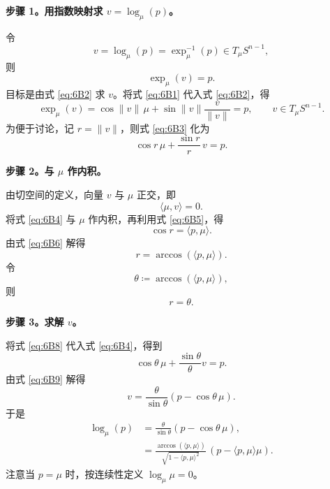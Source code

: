 \noindent\textbf{步骤 1。用指数映射求 $v=\log_\mu(p)$。}\par
令
\[
  v=\log_\mu(p)=\exp_\mu^{-1}(p)\in T_\mu S^{n-1},
\]
则
\begin{equation*}
  \exp_\mu(v)=p.
  \tag{6B2}\label{eq:6B2}
\end{equation*}
目标是由式 \eqref{eq:6B2} 求 $v$。将式 \eqref{eq:6B1} 代入式 \eqref{eq:6B2}，得
\begin{equation*}
  \exp_\mu(v)=\cos\lVert v\rVert\,\mu+\sin\lVert v\rVert\frac{v}{\lVert v\rVert}=p,
    \qquad v\in T_\mu S^{n-1}.
  \tag{6B3}\label{eq:6B3}
\end{equation*}
为便于讨论，记 $r=\lVert v\rVert$，则式 \eqref{eq:6B3} 化为
\begin{equation*}
  \cos r\,\mu+\frac{\sin r}{r}\,v=p.
  \tag{6B4}\label{eq:6B4}
\end{equation*}

\noindent\textbf{步骤 2。与 $\mu$ 作内积。}\par
由切空间的定义，向量 $v$ 与 $\mu$ 正交，即
\begin{equation*}
  \langle\mu,v\rangle=0.
  \tag{6B5}\label{eq:6B5}
\end{equation*}
将式 \eqref{eq:6B4} 与 $\mu$ 作内积，再利用式 \eqref{eq:6B5}，得
\begin{equation*}
  \cos r=\langle p,\mu\rangle.
  \tag{6B6}\label{eq:6B6}
\end{equation*}
由式 \eqref{eq:6B6} 解得
\begin{equation*}
  r=\arccos(\langle p,\mu\rangle).
  \tag{6B7}\label{eq:6B7}
\end{equation*}
令
\[
  \theta\coloneqq\arccos(\langle p,\mu\rangle),
\]
则
\begin{equation*}
  r=\theta.
  \tag{6B8}\label{eq:6B8}
\end{equation*}

\noindent\textbf{步骤 3。求解 $v$。}\par
将式 \eqref{eq:6B8} 代入式 \eqref{eq:6B4}，得到
\begin{equation*}
  \cos\theta\,\mu+\frac{\sin\theta}{\theta}v=p.
  \tag{6B9}\label{eq:6B9}
\end{equation*}
由式 \eqref{eq:6B9} 解得
\begin{equation*}
  v=\frac{\theta}{\sin\theta}(p-\cos\theta\,\mu).
  \tag{6B10}\label{eq:6B10}
\end{equation*}
于是
\begin{equation*}
\begin{aligned}
  \log_\mu(p)&=\frac{\theta}{\sin\theta}(p-\cos\theta\,\mu),\\
     &=\frac{\arccos(\langle p,\mu\rangle)}
             {\sqrt{1-\langle p,\mu\rangle^2}}\,(p-\langle p,\mu\rangle\mu).
\end{aligned}
\tag{6B11}\label{eq:6B11}
\end{equation*}
注意当 $p=\mu$ 时，按连续性定义 $\log_\mu\mu=0$。
